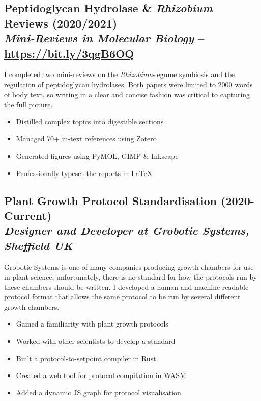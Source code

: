 \documentclass[twocolumn, a4paper, fontsize=9pt, headsepline, footsepline]{scrartcl}
\begin{document}
\subsection*{Peptidoglycan Hydrolase \& \emph{Rhizobium} Reviews
  (2020/2021)\\\vspace{-3pt}\textmd{\emph{Mini-Reviews in Molecular Biology} – \url{https://bit.ly/3qgB6OQ}}}
\noindent
I completed two mini-reviews on the \emph{Rhizobium}-legume symbiosis and the
regulation of peptidoglycan hydrolases. Both papers were limited to 2000 words
of body text, so writing in a clear and concise fashion was critical to
capturing the full picture.
\begin{itemize}
\item Distilled complex topics into digestible sections
\item Managed 70+ in-text references using Zotero
\item Generated figures using PyMOL, GIMP \& Inkscape
\item Professionally typeset the reports in \LaTeX
\end{itemize}

\subsection*{Plant Growth Protocol Standardisation
  (2020-Current)\\\vspace{-3pt}\textmd{\emph{Designer and Developer at Grobotic Systems, Sheffield UK}}}
\noindent
Grobotic Systems is one of many companies producing growth chambers for use in
plant science; unfortunately, there is no standard for how the protocols run by
these chambers should be written. I developed a human and machine readable
protocol format that allows the same protocol to be run by several different
growth chambers.
\begin{itemize}
\item Gained a familiarity with plant growth protocols
\item Worked with other scientists to develop a standard
\item Built a protocol-to-setpoint compiler in Rust
\item Created a web tool for protocol compilation in WASM
\item Added a dynamic JS graph for protocol visualisation
\end{itemize}
\end{document}
